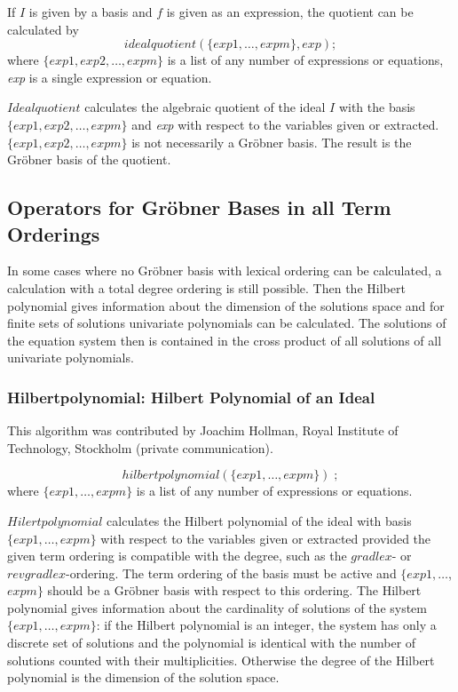 If $I$ is given by a basis and $f$ is given as an expression, the
quotient can be calculated by
\[
idealquotient (\{exp1, \ldots , expm\}, exp); \]
where $\{exp1, exp2, \ldots , expm\}$ is a list of any number of
expressions or equations, {\it exp} is a single expression or equation.

$Idealquotient$ calculates the algebraic quotient of the ideal $I$
with the basis  $\{exp1, exp2, \ldots , expm\}$ and {\it exp} with
respect to  the variables given or extracted.  $\{exp1, exp2, \ldots ,
expm\}$ is not necessarily a Gr\"obner basis.
The result is the Gr\"obner basis of the quotient.

\subsection{Operators for Gr\"obner Bases in all Term Orderings}
In some cases where no Gr\"obner
basis with lexical ordering can be calculated, a calculation with a total
degree ordering is still possible. Then the Hilbert polynomial gives
information about the dimension of the solutions space and for finite
sets of solutions univariate polynomials can be calculated. The solutions
of the equation system then is contained in the cross product of all
solutions of all univariate polynomials.

\subsubsection{Hilbertpolynomial: Hilbert Polynomial of an Ideal}
This algorithm was contributed by {\sc Joachim Hollman}, Royal
Institute of Technology, Stockholm (private communication).

\[
hilbertpolynomial (\{exp1, \ldots , expm\})\;;
\]
where $\{exp1, \ldots , expm\}$ is a list of any number of expressions
or equations.

$Hilertpolynomial$ calculates the Hilbert polynomial of the ideal
with basis $\{exp1, \ldots , expm\}$ with respect to the
variables given or extracted provided the given term ordering is
compatible with the degree, such as the $gradlex$- or $revgradlex$-ordering.
The term ordering of the basis
must be active and $\{exp1, \ldots$, $ expm\}$ should be a
Gr\"obner basis with respect to this ordering. The Hilbert polynomial
gives information about the cardinality of solutions of the system
$\{exp1, \ldots , expm\}$: if the Hilbert polynomial is an
integer, the system has only a discrete set of solutions and the
polynomial is identical with the number of solutions counted with
their multiplicities. Otherwise the degree of the Hilbert
polynomial is the dimension of the solution space.

